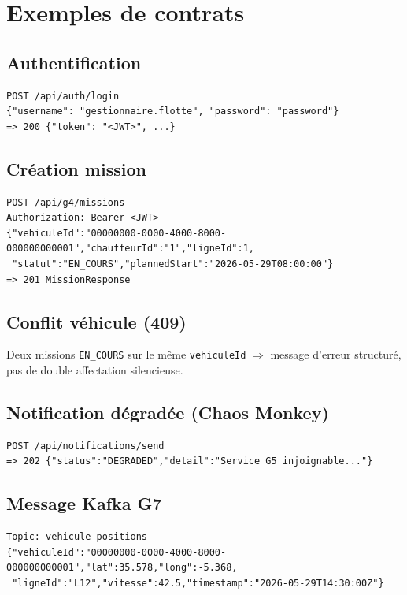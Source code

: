 \documentclass[12pt,a4paper]{report}
\begin{document}
\section{Exemples de contrats}

\subsection{Authentification}
\begin{lstlisting}
POST /api/auth/login
{"username": "gestionnaire.flotte", "password": "password"}
=> 200 {"token": "<JWT>", ...}
\end{lstlisting}

\subsection{Création mission}
\begin{lstlisting}
POST /api/g4/missions
Authorization: Bearer <JWT>
{"vehiculeId":"00000000-0000-4000-8000-000000000001","chauffeurId":"1","ligneId":1,
 "statut":"EN_COURS","plannedStart":"2026-05-29T08:00:00"}
=> 201 MissionResponse
\end{lstlisting}

\subsection{Conflit véhicule (409)}
Deux missions \texttt{EN\_COURS} sur le même \texttt{vehiculeId} $\Rightarrow$ message d'erreur structuré, pas de double affectation silencieuse.

\subsection{Notification dégradée (Chaos Monkey)}
\begin{lstlisting}
POST /api/notifications/send
=> 202 {"status":"DEGRADED","detail":"Service G5 injoignable..."}
\end{lstlisting}

\subsection{Message Kafka G7}
\begin{lstlisting}
Topic: vehicule-positions
{"vehiculeId":"00000000-0000-4000-8000-000000000001","lat":35.578,"long":-5.368,
 "ligneId":"L12","vitesse":42.5,"timestamp":"2026-05-29T14:30:00Z"}
\end{lstlisting}
\end{document}
